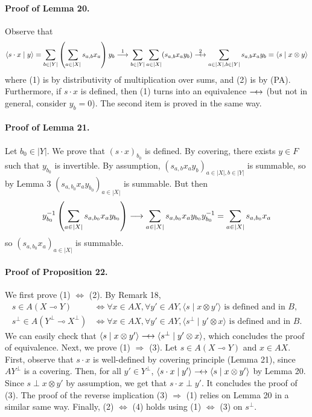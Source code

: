\documentclass[10pt,a4paper]{article}
\newcommand{\lolli}{\multimap}
\newcommand{\dimp}{\mathrel{\relbar\joinrel\rightarrow}}
\newcommand{\dequiv}{\mathrel{\relbar\joinrel\leftrightarrow}}
\newcommand{\scalar}[2]{\langle #1\mid #2\rangle}
\begin{document}
\paragraph{Proof of Lemma 20.} Observe that
\[\scalar{s\cdot x}{y}=\sum_{b\in|Y|}\left(\sum_{a\in|X|}s_{a,b}x_a\right)y_b\mathrel{\stackrel{1}{\dimp}}\sum_{b\in|Y|}\sum_{a\in|X|}(s_{a,b}x_ay_b)\mathrel{\stackrel{2}{\dequiv}}\sum_{a\in|X|,b\in|Y|}s_{a,b}x_ay_b=\scalar{s}{x\otimes y}\]
where (1) is by distributivity of multiplication over sums, and (2) is by (PA). Furthermore, if $s\cdot x$ is defined, then (1) turns into an equivalence $\dequiv$ (but not in general, consider $y_b=0$). The second item is proved in the same way.
\paragraph{Proof of Lemma 21.} Let $b_0\in|Y|$. We prove that $(s\cdot x)_{b_0}$ is defined. By covering, there exists $y\in F$ such that $y_{b_0}$ is invertible. By assumption, $(s_{a,b}x_ay_b)_{a\in|X|,b\in|Y|}$ is summable, so by Lemma 3 $(s_{a,b_0}x_ay_{b_0})_{a\in|X|}$ is summable. But then
\[y_{b_0}^{-1}\left(\sum_{a\in|X|}s_{a,b_0}x_ay_{b_0}\right)\dimp\sum_{a\in|X|}s_{a,b_0}x_ay_{b_0}y_{b_0}^{-1}=\sum_{a\in|X|}s_{a,b_0}x_a\]
so $(s_{a,b_0}x_a)_{a\in|X|}$ is summable.
\paragraph{Proof of Proposition 22.} We first prove (1) $\Leftrightarrow$ (2). By Remark 18,
\begin{align*}s\in A(X\lolli Y)&\iff\forall x\in AX,\forall y'\in AY,\scalar{s}{x\otimes y'}\text{ is defined and in }B,\\s^\perp\in A(Y^\perp\lolli X^\perp)&\iff\forall x\in AX,\forall y'\in AY,\scalar{s^\perp}{y'\otimes x}\text{ is defined and in }B.\end{align*}
We can easily check that $\scalar{s}{x\otimes y'}\dequiv\scalar{s^\perp}{y'\otimes x}$, which concludes the proof of equivalence. Next, we prove (1) $\Rightarrow$ (3). Let $s\in A(X\lolli Y)$ and $x\in AX$. First, observe that $s\cdot x$ is well-defined by covering principle (Lemma 21), since $AY^\perp$ is a covering. Then, for all $y'\in Y^\perp$, $\scalar{s\cdot x}{y'}\dequiv\scalar{s}{x\otimes y'}$ by Lemma 20. Since $s\perp x\otimes y'$ by assumption, we get that $s\cdot x\perp y'$. It concludes the proof of (3). The proof of the reverse implication (3) $\Rightarrow$ (1) relies on Lemma 20 in a similar same way. Finally, (2) $\Leftrightarrow$ (4) holds using (1) $\Leftrightarrow$ (3) on $s^\perp$.
\end{document}
